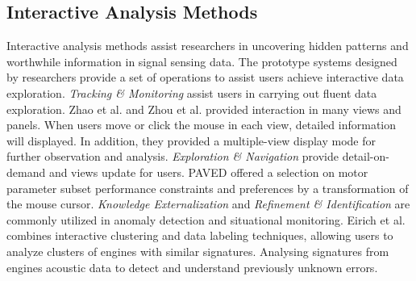 \documentclass[a4paper,fleqn]{cas-dc}
\begin{document}
\subsection{Interactive Analysis Methods}
Interactive analysis methods assist researchers in uncovering hidden patterns \cite{narechania2020safetylens} and worthwhile information \cite{eirich2021irvine} in signal sensing data.
The prototype systems \cite{eirich2021irvine, zhao2019visual, Zhou2018} designed by researchers provide a set of operations to assist users achieve interactive data exploration. 
\textit{Tracking \& Monitoring} assist users in carrying out fluent data exploration.
Zhao et al. \cite{zhao2019visual} and Zhou et al. \cite{Zhou2018} provided interaction in many views and panels. When users move or click the mouse in each view, detailed information will displayed. In addition, they provided a multiple-view display mode for further observation and analysis. 
\textit{Exploration \& Navigation} provide detail-on-demand and views update for users.
PAVED \cite{cibulski2020paved} offered a selection on motor parameter subset performance constraints and preferences by a transformation of the mouse cursor.
\textit{Knowledge Externalization} and \textit{Refinement \& Identification} are commonly utilized in anomaly detection and situational monitoring.
Eirich et al. \cite{eirich2021irvine} combines interactive clustering and data labeling techniques, allowing users to analyze clusters of engines with similar signatures. Analysing signatures from engines acoustic data to detect and understand previously unknown errors.

\end{document}
